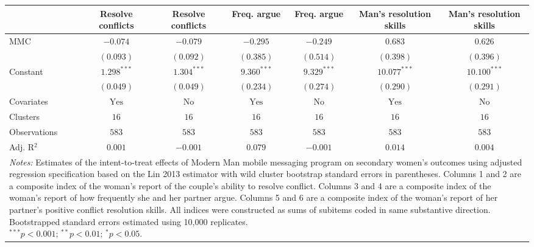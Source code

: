 
\begin{tabular}{l c c c c c c}
\toprule
 & Resolve conflicts & Resolve conflicts & Freq. argue & Freq. argue & Man's resolution skills & Man's resolution skills \\
\midrule
MMC          & $-0.074$       & $-0.079$      & $-0.295$       & $-0.249$      & $0.683$        & $0.626$        \\
             & $(0.093)$      & $(0.092)$     & $(0.385)$      & $(0.514)$     & $(0.398)$      & $(0.396)$      \\
Constant     & $1.298^{***}$  & $1.304^{***}$ & $9.360^{***}$  & $9.329^{***}$ & $10.077^{***}$ & $10.100^{***}$ \\
             & $(0.049)$      & $(0.049)$     & $(0.234)$      & $(0.274)$     & $(0.290)$      & $(0.291)$      \\
\midrule
Covariates   & $\textrm{Yes}$ & $\textrm{No}$ & $\textrm{Yes}$ & $\textrm{No}$ & $\textrm{Yes}$ & $\textrm{No}$  \\
Clusters     & $16$           & $16$          & $16$           & $16$          & $16$           & $16$           \\
Observations & $583$          & $583$         & $583$          & $583$         & $583$          & $583$          \\
Adj. R$^2$   & $0.001$        & $-0.001$      & $0.079$        & $-0.001$      & $0.014$        & $0.004$        \\
\bottomrule
\multicolumn{7}{l}{\scriptsize{\parbox{\linewidth}{\vspace{2pt}
       \textit{Notes:} Estimates of the intent-to-treat effects of Modern Man mobile
       messaging program on secondary women's outcomes using adjusted regression
       specification based on the Lin 2013 estimator with wild cluster bootstrap
       standard errors in parentheses. Columns 1 and 2 are a composite index of
       the woman's report of the couple's ability to resolve conflict. Columns 3 and 4
       are a composite index of the woman's report of how frequently she and her partner argue. 
       Columns 5 and 6 are a composite index of the woman's report of her partner's positive conflict 
       resolution skills. All indices were constructed as sums of subitems coded in same 
       substantive direction. Bootstrapped standard errors estimated using 10,000 replicates. \\ $^{***}p<0.001$; $^{**}p<0.01$; $^{*}p<0.05$.}}}
\end{tabular}
